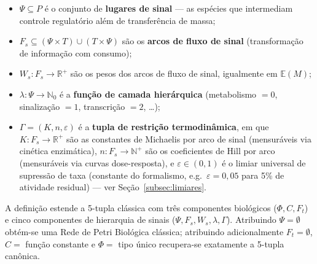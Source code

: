 \begin{definition}
\begin{itemize}
        $M(p) \geq \theta_i((p,t))$). Ambos os limiares $\tau_t, \theta_i
        \in \mathbb{E}(M)$ são expressões reais sobre a marcação; o caso
        clássico de limiar inteiro constante é recuperado por especialização.
        Esta diferenciação é \textbf{textual}, à maneira da própria
        diferenciação clássica entre arcos de entrada e arcos de saída em
        $F$, e \emph{não} introduz novo elemento na tupla;
  \item $\Psi \subseteq P$ é o conjunto de \textbf{lugares de sinal} --- as
        espécies que intermediam controle regulatório além de transferência de massa;
  \item $F_s \subseteq (\Psi \times T) \cup (T \times \Psi)$ são os
        \textbf{arcos de fluxo de sinal} (transformação de informação com
        consumo);
  \item $W_s: F_s \to \mathbb{R}^+$ são os pesos dos arcos de fluxo de sinal,
        igualmente em $\mathbb{E}(M)$;
  \item $\lambda: \Psi \to \mathbb{N}_0$ é a \textbf{função de camada
        hierárquica} (metabolismo $= 0$, sinalização $= 1$, transcrição $= 2$,
        \ldots);
  \item $\Gamma = (K, n, \varepsilon)$ é a \textbf{tupla de restrição
        termodinâmica}, em que $K: F_s \to \mathbb{R}^+$ são as constantes
        de Michaelis por arco de sinal (mensuráveis via cinética enzimática),
        $n: F_s \to \mathbb{N}^+$ são os coeficientes de Hill por arco
        (mensuráveis via curvas dose-resposta), e
        $\varepsilon \in (0,1)$ é o limiar universal de supressão de taxa
        (constante do formalismo, e.g.\ $\varepsilon = 0{,}05$ para 5\% de
        atividade residual) --- ver Seção~\ref{subsec:limiares}.
\end{itemize}
\end{definition}

A definição estende a 5-tupla clássica com três componentes biológicos
($\Phi, C, F_t$) e cinco componentes de hierarquia de sinais ($\Psi, F_s, W_s,
\lambda, \Gamma$). Atribuindo $\Psi = \emptyset$ obtém-se uma Rede de Petri
Biológica clássica; atribuindo adicionalmente $F_t = \emptyset$, $C = $ função
constante e $\Phi = $ tipo único recupera-se exatamente a 5-tupla canônica.

